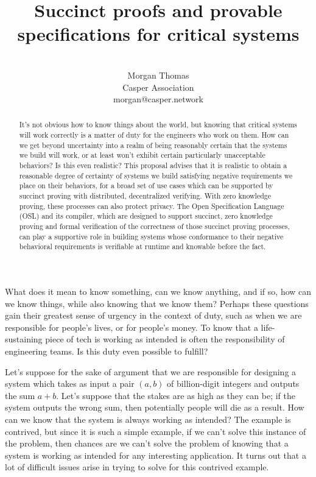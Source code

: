 \documentclass[11pt]{article}
\title{Succinct proofs and provable specifications for critical systems}
\author{ \\ Morgan Thomas \\ Casper Association \\ morgan@casper.network }
\begin{document}
\maketitle

\begin{abstract}
	It's not obvious how to know things about the world, but knowing that
	critical systems will work correctly is a matter of duty for the
	engineers who work on them. How can we get beyond uncertainty into a
	realm of being reasonably certain that the systems we build will work,
	or at least won't exhibit certain particularly unacceptable behaviors? 
	Is this even realistic? This proposal advises that it is realistic to
	obtain a reasonable degree of certainty of systems we build
	satisfying negative requirements we place on their behaviors, for
	a broad set of use cases which can be supported by succinct proving
	with distributed, decentralized verifying. With zero knowledge proving,
	these processes can also protect privacy. The Open Specification Language
	(OSL) and its compiler, which are designed to support succinct, zero knowledge proving
	and formal verification of the correctness of those succinct proving processes,
	can play a supportive role in building
	systems whose conformance to their negative behavioral requirements is verifiable
	at runtime and knowable before the fact.
\end{abstract}

What does it mean to know something, can we know anything, and if so, how
can we know things, while also knowing that we know them? Perhaps these questions
gain their greatest sense of urgency in the context of duty, such as when we are
responsible for people's lives, or for people's money. To know that a life-sustaining
piece of tech is working as intended is often the responsibility of engineering teams.
Is this duty even possible to fulfill?

Let's suppose for the sake of argument that we are responsible for designing a system
which takes as input a pair $(a,b)$  of billion-digit integers and outputs the sum $a + b$.
Let's suppose that the stakes are as high as they can be; if the system outputs the wrong
sum, then potentially people will die as a result. How can we know that the system is always
working as intended? The example is contrived, but since it is such a simple example,
if we can't solve this instance of the problem, then chances are we can't solve the problem
of knowing that a system is working as intended for any interesting application.
It turns out that a lot of difficult issues arise in trying to solve for this contrived example.
\end{document}
